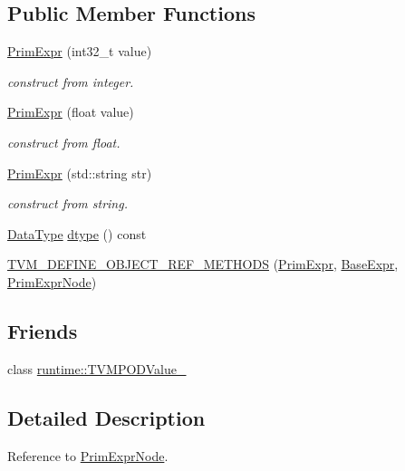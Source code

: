 \subsection*{Public Member Functions}
\begin{DoxyCompactItemize}
\item 
\hyperlink{classtvm_1_1PrimExpr_a7f0ca30e951608a0b36a77a66d4d19e0}{Prim\+Expr} (int32\+\_\+t value)
\begin{DoxyCompactList}\small\item\em construct from integer. \end{DoxyCompactList}\item 
\hyperlink{classtvm_1_1PrimExpr_a756d3f8b17b019560946524951ae6118}{Prim\+Expr} (float value)
\begin{DoxyCompactList}\small\item\em construct from float. \end{DoxyCompactList}\item 
\hyperlink{classtvm_1_1PrimExpr_aa7ef79a97755173304b89581e79d485a}{Prim\+Expr} (std\+::string str)
\begin{DoxyCompactList}\small\item\em construct from string. \end{DoxyCompactList}\item 
\hyperlink{namespacetvm_a41918af1a1dc386388639a9d3ad06c5d}{Data\+Type} \hyperlink{classtvm_1_1PrimExpr_a1098008618699c33adfbd19e582f9ffd}{dtype} () const 
\item 
\hyperlink{classtvm_1_1PrimExpr_a3ad47a31c4ce693077a93f154b2b1e12}{T\+V\+M\+\_\+\+D\+E\+F\+I\+N\+E\+\_\+\+O\+B\+J\+E\+C\+T\+\_\+\+R\+E\+F\+\_\+\+M\+E\+T\+H\+O\+DS} (\hyperlink{classtvm_1_1PrimExpr}{Prim\+Expr}, \hyperlink{classtvm_1_1BaseExpr}{Base\+Expr}, \hyperlink{classtvm_1_1PrimExprNode}{Prim\+Expr\+Node})
\end{DoxyCompactItemize}
\subsection*{Friends}
\begin{DoxyCompactItemize}
\item 
class \hyperlink{classtvm_1_1PrimExpr_a036e6d2e955a7aad104e989af37b7c67}{runtime\+::\+T\+V\+M\+P\+O\+D\+Value\+\_\+}
\end{DoxyCompactItemize}


\subsection{Detailed Description}
Reference to \hyperlink{classtvm_1_1PrimExprNode}{Prim\+Expr\+Node}. 

